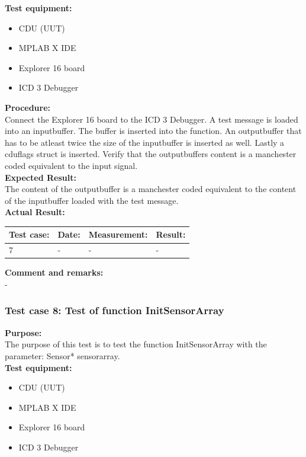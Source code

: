 \textbf{Test equipment:}
\begin{itemize}
\item CDU (UUT)
\item MPLAB X IDE
\item Explorer 16 board
\item ICD 3 Debugger
\end{itemize}

\textbf{Procedure:}\\
Connect the Explorer 16 board to the ICD 3 Debugger. A test message is loaded into an inputbuffer. The buffer is inserted into the function. An outputbuffer that has to be atleast twice the size of the inputbuffer is inserted as well. Lastly a cduflags struct is inserted. Verify that the outputbuffers content is a manchester coded equivalent to the input signal.\\

\textbf{Expected Result:}\\
The content of the outputbuffer is a manchester coded equivalent to the content of the inputbuffer loaded with the test message.\\

\textbf{Actual Result:}\\
\begin{table}[H]
\centering
\begin{tabular}{|p{2cm}|p{2cm}|p{3cm}|p{2cm}|}\hline
\textbf{Test case:} & \textbf{Date:} & \textbf{Measurement:} & \textbf{Result:} \\ \hline
7 & - & - & - \\ \hline
\end{tabular}
\end{table}

\textbf{Comment and remarks:}\\
-\\

\subsubsection{Test case 8: Test of function InitSensorArray }
\textbf{Purpose:}\\
The purpose of this test is to test the function InitSensorArray with the parameter: Sensor* sensorarray.\\

\textbf{Test equipment:}
\begin{itemize}
\item CDU (UUT)
\item MPLAB X IDE
\item Explorer 16 board
\item ICD 3 Debugger
\end{itemize}

